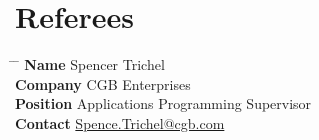 \documentclass[10pt]{article} %
\begin{document}


\section{Referees}
\vspace{-6mm}

\parbox{0.5\textwidth}{ %
\begin{tabbing}
\hspace{2.75cm} \= \hspace{4cm} \= \kill %
{\bf Name} \> Spencer Trichel \\ %
{\bf Company} \> CGB Enterprises \\ %
{\bf Position} \> Applications Programming Supervisor \\ %
{\bf Contact} \> \href{mailto:Spence.Trichel@cgb.com}{Spence.Trichel@cgb.com} %
\end{tabbing}}

\end{document}
